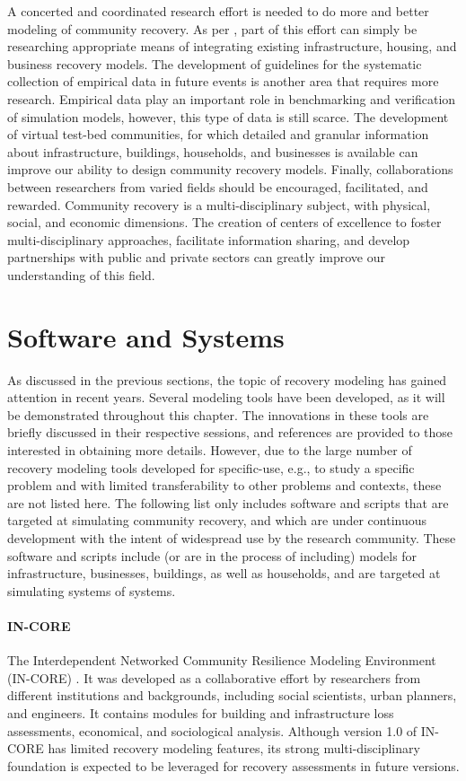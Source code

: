 A concerted and coordinated research effort is needed to do more and better modeling of community recovery. As per \citep{miles2019community}, part of this effort can simply be researching appropriate means of integrating existing infrastructure, housing, and business recovery models. The development of guidelines for the systematic collection of empirical data in future events is another area that requires more research. Empirical data play an important role in benchmarking and verification of simulation models, however, this type of data is still scarce. The development of virtual test-bed communities, for which detailed and granular information about infrastructure, buildings, households, and businesses is available can improve our ability to design community recovery models. Finally, collaborations between researchers from varied fields should be encouraged, facilitated, and rewarded. Community recovery is a multi-disciplinary subject, with physical, social, and economic dimensions. The creation of centers of excellence to foster multi-disciplinary approaches, facilitate information sharing, and develop partnerships with public and private sectors can greatly improve our understanding of this field.\ 

\FloatBarrier
\section{Software and Systems}
As discussed in the previous sections, the topic of recovery modeling has gained attention in recent years. Several modeling tools have been developed, as it will be demonstrated throughout this chapter. The innovations in these tools are briefly discussed in their respective sessions, and references are provided to those interested in obtaining more details. However, due to the large number of recovery modeling tools developed for specific-use, e.g., to study a specific problem and with limited transferability to other problems and contexts, these are not listed here. The following list only includes software and scripts that are targeted at simulating community recovery, and which are under continuous development with the intent of widespread use by the research community. These software and scripts include (or are in the process of including) models for infrastructure, businesses, buildings, as well as households, and are targeted at simulating systems of systems.\

\paragraph{IN-CORE}
The Interdependent Networked Community Resilience Modeling Environment (IN-CORE) \citep{InCORE}. It was developed as a collaborative effort by researchers from different institutions and backgrounds, including social scientists, urban planners, and engineers. It contains modules for building and infrastructure loss assessments, economical, and sociological analysis. Although version 1.0 of IN-CORE has limited recovery modeling features, its strong multi-disciplinary foundation is expected to be leveraged for recovery assessments in future versions.

